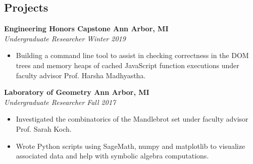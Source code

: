 \documentclass[margin,line]{resume}
\begin{document}
\begin{resume}
	\sectionbreak
	\section{\mysidestyle Projects}
	
	\textbf{Engineering Honors Capstone \href{https://github.com/jonathoma/js-correctness-checker}{\faGithub} \hfill Ann Arbor, MI} \\\vspace{1mm}%
	\textsl{Undergraduate Researcher} \hfill \textsl{Winter 2019}
	\begin{itemize}[leftmargin=4mm]
		\item Building a command line tool to assist in checking correctness in the DOM trees and memory heaps of cached JavaScript function executions under faculty advisor Prof. Harsha Madhyastha.
	\end{itemize}
	\vspace{-1.5mm}
	
	\textbf{Laboratory of Geometry \href{https://github.com/jonathoma/LogM}{\faGithub} \hfill Ann Arbor, MI} \\\vspace{1mm}%
	\textsl{Undergraduate Researcher} \hfill \textsl{Fall 2017}
	\begin{itemize}[leftmargin=4mm]
		\item Investigated the combinatorics of the Mandlebrot set under faculty advisor Prof. Sarah Koch.
		\item Wrote Python scripts using SageMath, numpy and matplotlib to visualize associated data and help with symbolic algebra computations. 
	\end{itemize}
	

\end{resume}
\end{document}
